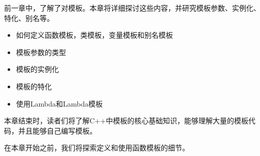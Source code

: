 前一章中，了解了对模板。本章将详细探讨这些内容，并研究模板参数、实例化、特化、别名等。

\begin{itemize}
\item
如何定义函数模板，类模板，变量模板和别名模板

\item
模板参数的类型

\item
模板的实例化

\item
模板的特化

\item
使用Lambda和Lambda模板
\end{itemize}

本章结束时，读者们将了解C++中模板的核心基础知识，能够理解大量的模板代码，并且能够自己编写模板。

在本章开始之前，我们将探索定义和使用函数模板的细节。












